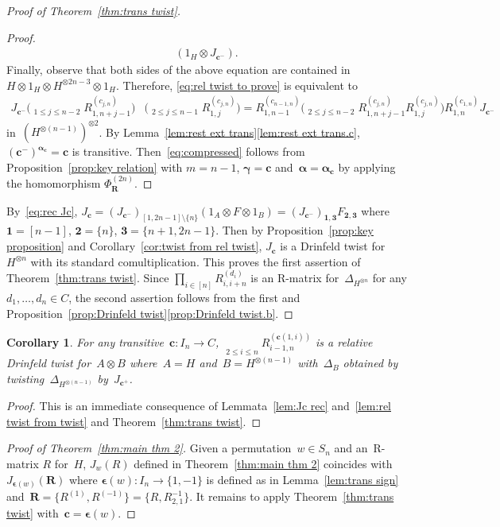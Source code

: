 \documentclass[12pt, reqno]{amsart}
\newtheorem{corollary}[theorem]{Corollary}
\theoremstyle{definition}
\newcommand{\ascprod}{\mathop{\overrightarrow{\prod}}}
\newcommand{\dscprod}{\mathop{\overleftarrow{\prod}}}
\numberwithin{equation}{section}
\newcommand{\tensor}{\otimes}
\newcommand{\sgna}[1]{\boldsymbol{\epsilon}(#1)}
\begin{document}
\begin{proof}[Proof of Theorem~\ref{thm:trans twist}]
\begin{proof}
\begin{multline*}
(1_H\tensor J_{\mathbf c^-}).
\end{multline*}
Finally, observe that both sides of the above 
equation are contained in $H\tensor 1_H\tensor H^{\tensor 2n-3}\tensor 1_H$. Therefore, \eqref{eq:rel twist to prove} is equivalent to
\begin{align}
J_{\mathbf c^-}\Big(\dscprod_{1\le j\le n-2}\!\!
R_{1,n+j-1}^{(c_{j,n})}\Big)&\Big(\dscprod_{2\le j\le n-1}\!\!
R_{1,j}^{(c_{j,n})}\Big)=R_{1,n-1}^{(c_{n-1,n})}\Big(\dscprod_{2\le j\le n-2}\!\!
R_{1,n+j-1}^{(c_{j,n})}R_{1,j}^{(c_{j,n})}\Big)R_{1,n}^{(c_{1,n})}
J_{\mathbf c^-}\label{eq:compressed}
\end{align}
in~$(H^{\tensor (n-1)})^{\tensor 2}$.  By Lemma~\ref{lem:rest ext trans}\ref{lem:rest ext trans.c}, $(\mathbf c^-)^{\boldsymbol\alpha_{\mathbf c}}=\mathbf c$ is transitive. Then~\eqref{eq:compressed} follows 
from Proposition~\ref{prop:key relation} with $m=n-1$, $\boldsymbol{\gamma}=\mathbf c$ 
and~$\boldsymbol{\alpha}=\boldsymbol{\alpha}_{\mathbf c}$
by applying
the homomorphism $\Phi^{(2n)}_{\mathbf R}$.
\end{proof}
By~\eqref{eq:rec Jc}, $J_{\mathbf c}=(J_{\mathbf c^-})_{[1,2n-1]\setminus\{n\}}(1_A\tensor F\tensor 1_B)=(J_{\mathbf c^-})_{\mathbf 1,\mathbf 3}F_{\mathbf 2,\mathbf 3}$
where~$\mathbf 1=[n-1]$, $\mathbf 2=\{n\}$, $\mathbf 3=\{n+1,2n-1\}$. Then
by
Proposition~\ref{prop:key proposition} and Corollary~\ref{cor:twist from rel twist},
$J_{\mathbf c}$ 
is a Drinfeld twist for~$H^{\tensor n}$ with its standard comultiplication. This proves the first
assertion of Theorem~\ref{thm:trans twist}. Since
$\prod_{i\in[n]}R_{i,i+n}^{(d_i)}$ is an R-matrix
for~$\Delta_{H^{\tensor n}}$ for any $d_1,\dots,d_n\in C$,
the second 
assertion follows from the first and Proposition~\ref{prop:Drinfeld twist}\ref{prop:Drinfeld twist.b}.
\end{proof}
\begin{corollary}\label{cor:other recursion Jc}
For any transitive~$\mathbf c:I_n\to C$, $\ascprod\limits_{2\le i\le n} R_{i-1,n}^{(\mathbf c(1,i))}$ is a relative Drinfeld twist 
for~$A\tensor B$ where~$A=H$ and~$B=H^{\tensor (n-1)}$ with~$\Delta_B$ obtained by twisting~$\Delta_{H^{\tensor(n-1)}}$ by~$J_{\mathbf c^+}$.
\end{corollary}
\begin{proof}
This is an immediate consequence of Lemmata~\ref{lem:Jc rec} and~\ref{lem:rel twist from twist} and Theorem~\ref{thm:trans twist}.
\end{proof}
\begin{proof}[Proof of Theorem~\ref{thm:main thm 2}]
Given a permutation~$w\in S_n$ and an~R-matrix $R$ for~$H$, $J_w(R)$ defined in Theorem~\ref{thm:main thm 2}
coincides with~$J_{\sgna{w}}(\mathbf  R)$ where
$\sgna{w}:I_n\to\{1,-1\}$ is defined as in Lemma~\ref{lem:trans sign} and~$\mathbf R=\{R^{(1)},R^{(-1)}\}=
\{R,R_{2,1}^{-1}\}$. It remains to apply Theorem~\ref{thm:trans twist} with~$\mathbf c=\sgna{w}$.
\end{proof}
\end{document}

